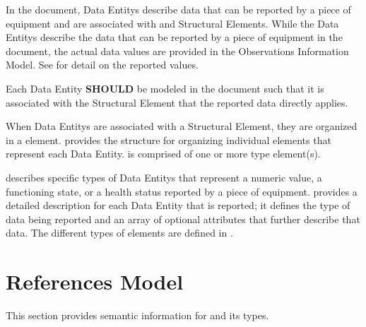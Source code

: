 In the  document, \glspl{Data Entity} describe data that can be reported by a piece of equipment and are associated with  and  \glspl{Structural Element}.   While the \glspl{Data Entity} describe the data that can be reported by a piece of equipment in the  document, the actual data values are provided in the \gls{Observations Information Model}.   See  for detail on the reported values.

Each \gls{Data Entity} \textbf{SHOULD} be modeled in the  document such that it is associated with the \gls{Structural Element} that the reported data directly applies.

When \glspl{Data Entity} are associated with a \gls{Structural Element}, they are organized in a  element.    provides the structure for organizing individual  elements that represent each \gls{Data Entity}.  is comprised of one or more  type element(s).

 describes specific types of \glspl{Data Entity} that represent a numeric value, a functioning state, or a health status reported by a piece of equipment.  provides a detailed description for each \gls{Data Entity} that is reported; it defines the type of data being reported and an array of optional attributes that further describe that data.   The different types of  elements are defined in .













\section{References Model}
\label{sec:References Model}

This section provides semantic information for  and its types.



